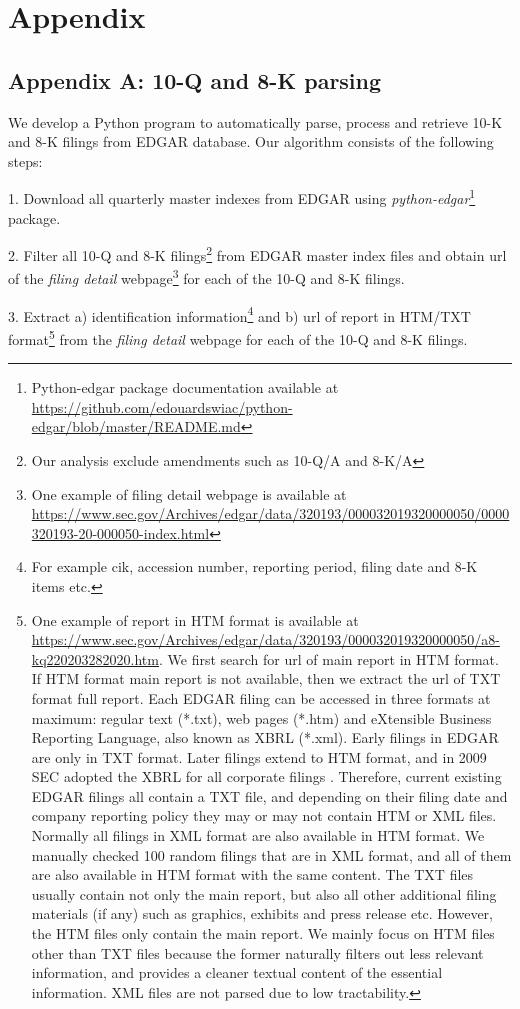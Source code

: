 \section*{Appendix}
\subsection*{Appendix A: 10-Q and 8-K parsing}
\label{appa}
We develop a Python program to automatically parse, process and retrieve 10-K and 8-K filings from EDGAR database. Our algorithm consists of the following steps:

1. Download all quarterly master indexes from EDGAR using \textit{python-edgar}\footnote{Python-edgar package documentation available at \url{https://github.com/edouardswiac/python-edgar/blob/master/README.md}} package.

2. Filter all 10-Q and 8-K filings\footnote{Our analysis exclude amendments such as 10-Q/A and 8-K/A} from EDGAR master index files and obtain url of the \textit{filing detail} webpage\footnote{One example of filing detail webpage is available at \url{https://www.sec.gov/Archives/edgar/data/320193/000032019320000050/0000320193-20-000050-index.html}} for each of the 10-Q and 8-K filings. 

3. Extract a) identification information\footnote{For example cik, accession number, reporting period, filing date and 8-K items etc.} and b) url of report in HTM/TXT format\footnote{One example of report in HTM format is available at \url{https://www.sec.gov/Archives/edgar/data/320193/000032019320000050/a8-kq220203282020.htm}. We first search for url of main report in HTM format. If HTM format main report is not available, then we extract the url of TXT format full report. Each EDGAR filing can be accessed in three formats at maximum: regular text (*.txt), web pages (*.htm) and eXtensible Business Reporting Language, also known as XBRL (*.xml). Early filings in EDGAR are only in TXT format. Later filings extend to HTM format, and in 2009 SEC adopted the XBRL for all corporate filings \cite{secFinalRuleInteractive2009}. Therefore, current existing EDGAR filings all contain a TXT file, and depending on their filing date and company reporting policy they may or may not contain HTM or XML files. Normally all filings in XML format are also available in HTM format. We manually checked 100 random filings that are in XML format, and all of them are also available in HTM format with the same content. The TXT files usually contain not only the main report, but also all other additional filing materials (if any) such as graphics, exhibits and press release etc. However, the HTM files only contain the main report. We mainly focus on HTM files other than TXT files because the former naturally filters out less relevant information, and provides a cleaner textual content of the essential information. XML files are not parsed due to low tractability. } from the \textit{filing detail} webpage for each of the 10-Q and 8-K filings. 

